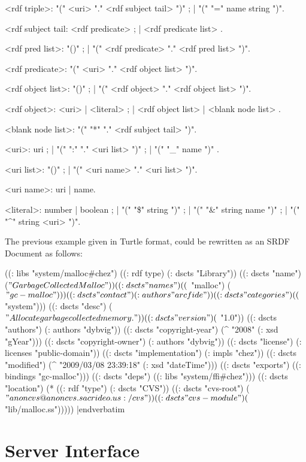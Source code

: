 <rdf triple>:   "(" <uri> "." <rdf subject tail> ")" ; | "(" "=" name string ")".

<rdf subject tail: <rdf predicate> ; | <rdf predicate list> .

<rdf pred list>: "()" ; | "(" <rdf predicate> "." <rdf pred list> ")".

<rdf predicate>: "(" <uri> "." <rdf object list> ")".

<rdf object list>: "()" ; | "(" <rdf object> "." <rdf object list> ")".

<rdf object>: <uri> | <literal>
        ; | <rdf object list> | <blank node list> .

<blank node list>: "(" "*" "." <rdf subject tail> ")".

<uri>: uri ; | "(" ":" "." <uri list> ")" ; | "(" "\_" name ")" .

<uri list>: "()" ; | "(" <uri name> "." <uri list> ")".

<uri name>: uri | name.

<literal>: number | boolean ; | "(" "\$" string ")" ; |
        "(" "\&" string name ")" ; | "(" "\^{}" string <uri> ")".

\endgrammar
\endgroup
\endgroup
\medskip

The previous example given in Turtle format, could be rewritten as 
an SRDF Document as follows:

\medskip
\verbatim
((: libs "system/malloc#chez")
 ((: rdf type) 
  (: dscts "Library"))
 ((: dscts "name") 
  ($ "Garbage Collected Malloc"))
 ((: dscts "names") 
  (($ "malloc") ($ "gc-malloc")))
 ((: dscts "contact") 
  (: authors "arcfide"))
 ((: dscts "categories") 
  (($ "system")))
 ((: dscts "desc") 
  ($ "Allocate garbage collected memory."))
 ((: dscts "version") 
  ($ "1.0"))
 ((: dscts "authors") 
  (: authors "dybvig"))
 ((: dscts "copyright-year") 
  (^ "2008" (: xsd "gYear")))
 ((: dscts "copyright-owner") 
  (: authors "dybvig"))
 ((: dscts "license") 
  (: licenses "public-domain"))
 ((: dscts "implementation") (: impls "chez"))
 ((: dscts "modified") 
  (^ "2009/03/08 23:39:18" 
     (: xsd "dateTime")))
 ((: dscts "exports") 
  ((: bindings "gc-malloc")))
 ((: dscts "deps") 
  ((: libs "system/ffi#chez")))
 ((: dscts "location") 
  (* ((: rdf "type") (: dscts "CVS"))
     ((: dscts "cvs-root")
      ($ "anoncvs@anoncvs.sacrideo.us:/cvs"))
     ((: dscts "cvs-module") 
      ($ "lib/malloc.ss")))))
|endverbatim

\section{Server Interface}

